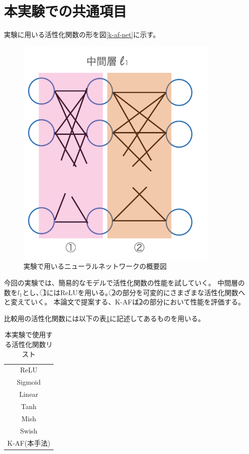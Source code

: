 \section{本実験での共通項目}
\label{exp_common}

実験に用いる活性化関数の形を図\ref{k-af-net}に示す。
\begin{figure}[hbtp]
\label{k-af-net}
    \begin{center}
        \includegraphics[width=10cm]{asset/k-af-net.png}
            \caption{実験で用いるニューラルネットワークの概要図}
            \label{neural_network1}
    \end{center}
\end{figure}

今回の実験では、簡易的なモデルで活性化関数の性能を試していく。
中間層の数を$ l_1 $とし、\textcircled{\scriptsize 1}にはReLUを用いる。\textcircled{\scriptsize 2}の部分を可変的にさまざまな活性化関数へと変えていく。
本論文で提案する、K-AFは\textcircled{\scriptsize 2}の部分において性能を評価する。

比較用の活性化関数には以下の表\ref{list:af_table}に記述してあるものを用いる。


\begin{table}[htbp]
    \begin{center}
        \caption{本実験で使用する活性化関数リスト}
        \label{list:af_table}
        \vspace{2mm} 
        \begin{tabular}{ |c| }
        \hline
        ReLU \\
        Sigmoid \\
        Linear \\
        Tanh   \\
        Mish  \\
        Swish  \\
        K-AF(本手法)   \\
        \hline
        \end{tabular}
    \end{center}
\end{table}



